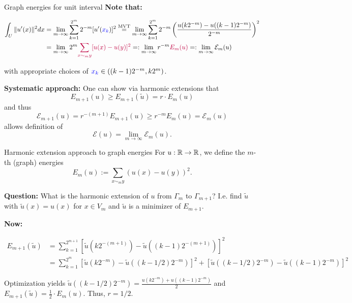 \begin{frame}{Graph energies for unit interval}
    \textbf{Note that:}
    \begin{scriptsize}
        \begin{align*}
            \int_U \| u'(x) \|^2 dx &= \lim_{m\to\infty} \sum_{k=1}^{2^m} 2^{-m} [u'(\textcolor{blue}{x_k})]^2
            \overset{\text{MVT}}= \lim_{m \to \infty} \sum_{k=1}^{2^m} 2^{-m} \left( \frac{u(k2^{-m}) - u((k-1)2^{-m})}{2^{-m}} \right)^2 \\
            &= \lim_{m \to \infty} 2^m \textcolor{purple}{\sum_{x \sim_m y} [ u(x) - u(y) ]^2}
            =: \lim_{m \to \infty} r^{-m} \textcolor{purple}{E_m(u)} =: \lim_{m\to\infty} \mathcal{E}_m (u)
        \end{align*}
    \end{scriptsize}
    with appropriate choices of \(\textcolor{blue}{x_k} \in ((k-1)2^{-m}, k2^m) \).

    \textbf{Systematic approach:} One can show via harmonic extensions that
    \[ E_{m+1}(u) \geq E_{m+1}(\tilde{u}) = r \cdot E_m(u) \]
    and thus
    \[ \mathcal{E}_{m+1}(u) = r^{-(m+1)} E_{m+1}(u) \geq r^{-m} E_m(u) = \mathcal{E}_m(u) \]
    allows definition of
    \[ \mathcal{E}(u) = \lim_{m\to \infty} \mathcal{E}_m(u). \]
\end{frame}

\begin{frame}{Harmonic extension approach to graph energies}
    For \(u: \mathbb{R} \to \mathbb{R} \), we define the \(m\)-th (graph) energies
    \[ E_m(u) := \sum_{x \sim_m y} \left( u(x) - u(y) \right)^2. \]

    \textbf{Question:} What is the harmonic extension of \(u \) from \(\Gamma_m \) to \(\Gamma_{m+1} \)?
    I.e. find \(\tilde{u} \) with \(\tilde{u}(x) = u(x) \) for \(x \in V_m \) and \(\tilde{u} \) is a minimizer of \(E_{m+1} \).

    \textbf{Now:}
    \begin{scriptsize}
        \begin{align*}
            E_{m+1}(\tilde{u}) &= \sum_{k=1}^{2^{m+1}} [\tilde{u}(k2^{-(m+1)}) - \tilde{u}((k-1)2^{-(m+1)})]^2 \\
            &= \sum_{k=1}^{2^m} [\tilde{u}(k2^{-m}) - \tilde{u}((k-1/2)2^{-m})]^2 + [\tilde{u}((k-1/2)2^{-m}) - \tilde{u}((k-1)2^{-m})]^2
        \end{align*}
    \end{scriptsize}
    Optimization yields \(\tilde{u}((k-1/2)2^{-m}) = \frac{u(k2^{-m}) + u((k-1)2^{-m})}{2} \) and \(E_{m+1}(\tilde{u}) = \frac{1}{2} \cdot E_m(u) \). Thus, \(r = 1/2 \).
\end{frame}
